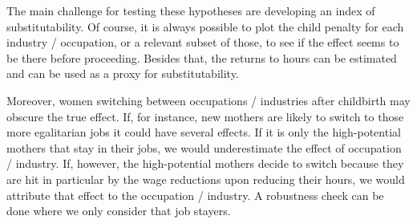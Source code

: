 \documentclass[10pt]{article}
\begin{document}
The main challenge for testing these hypotheses are developing an index of substitutability. Of course, it is always possible to plot the child penalty for each industry / occupation, or a relevant subset of those, to see if the effect seems to be there before proceeding. Besides that, the returns to hours can be estimated and can be used as a proxy for substitutability.

Moreover, women switching between occupations / industries after childbirth may obscure the true effect. If, for instance, new mothers are likely to switch to those more egalitarian jobs it could have several effects. If it is only the high-potential mothers that stay in their jobs, we would underestimate the effect of occupation / industry. If, however, the high-potential mothers decide to switch because they are hit in particular by the wage reductions upon reducing their hours, we would attribute that effect to the occupation / industry. A robustness check can be done where we only consider that job stayers.

\newpage


\end{document}
